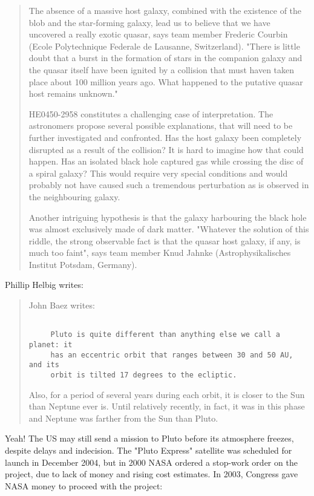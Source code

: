 \begin{quote}
 The absence of a massive host galaxy, combined with the existence 
 of the blob and the star-forming galaxy, lead us to believe that 
 we have uncovered a really exotic quasar, says team member Frederic 
 Courbin (Ecole Polytechnique Federale de Lausanne, Switzerland). 
 "There is little doubt that a burst in the formation of stars in 
 the companion galaxy and the quasar itself have been ignited by a 
 collision that must haven taken place about 100 million years ago. 
 What happened to the putative quasar host remains unknown."

 HE0450-2958 constitutes a challenging case of interpretation. 
 The astronomers propose several possible explanations, that will 
 need to be further investigated and confronted. Has the host galaxy 
 been completely disrupted as a result of the collision? It is hard 
 to imagine how that could happen. Has an isolated black hole captured 
 gas while crossing the disc of a spiral galaxy? This would require 
 very special conditions and would probably not have caused such a 
 tremendous perturbation as is observed in the neighbouring galaxy.

 Another intriguing hypothesis is that the galaxy harbouring the black 
 hole was almost exclusively made of dark matter. "Whatever the solution 
 of this riddle, the strong observable fact is that the quasar host 
 galaxy, if any, is much too faint", says team member Knud Jahnke 
 (Astrophysikalisches Institut Potsdam, Germany). 
\end{quote}

Phillip Helbig writes:

\begin{quote}
 John Baez writes:


\begin{verbatim}

     Pluto is quite different than anything else we call a planet: it 
     has an eccentric orbit that ranges between 30 and 50 AU, and its 
     orbit is tilted 17 degrees to the ecliptic.  
\end{verbatim}
    
 Also, for a period of several years during each orbit, it is closer to 
 the Sun than Neptune ever is.  Until relatively recently, in fact, it 
 was in this phase and Neptune was farther from the Sun than Pluto.
\end{quote}

Yeah!  The US may still send a mission to Pluto before its atmosphere 
freezes, despite delays and indecision.  The "Pluto Express" 
satellite was scheduled for launch in December 2004, but in 2000 NASA ordered 
a stop-work order on the project, due to lack of money and rising cost 
estimates.  In 2003, Congress gave NASA money to proceed with the project:

